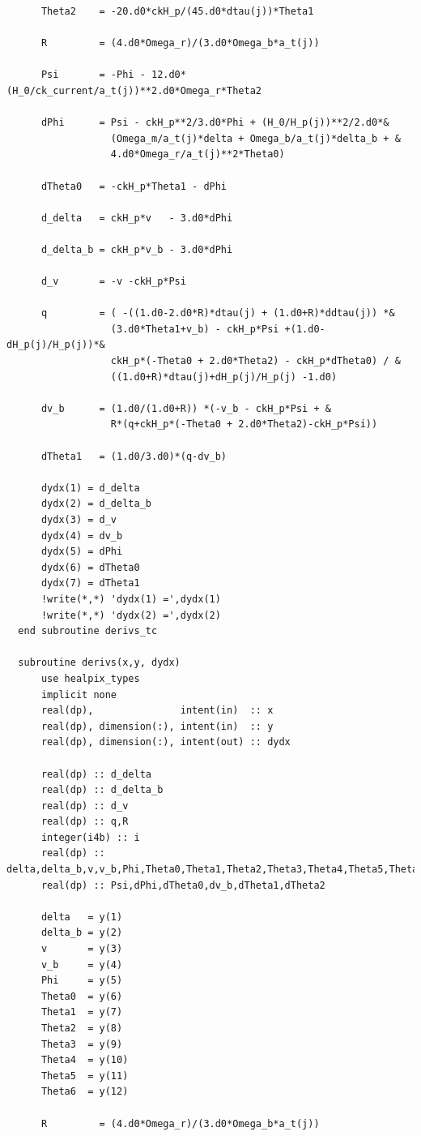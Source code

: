 \documentclass[a4paper]{report}
\begin{document}
\begin{verbatim}
      Theta2    = -20.d0*ckH_p/(45.d0*dtau(j))*Theta1

      R         = (4.d0*Omega_r)/(3.d0*Omega_b*a_t(j))

      Psi       = -Phi - 12.d0*(H_0/ck_current/a_t(j))**2.d0*Omega_r*Theta2

      dPhi      = Psi - ckH_p**2/3.d0*Phi + (H_0/H_p(j))**2/2.d0*&
                  (Omega_m/a_t(j)*delta + Omega_b/a_t(j)*delta_b + &
                  4.d0*Omega_r/a_t(j)**2*Theta0)

      dTheta0   = -ckH_p*Theta1 - dPhi

      d_delta   = ckH_p*v   - 3.d0*dPhi

      d_delta_b = ckH_p*v_b - 3.d0*dPhi

      d_v       = -v -ckH_p*Psi

      q         = ( -((1.d0-2.d0*R)*dtau(j) + (1.d0+R)*ddtau(j)) *&
                  (3.d0*Theta1+v_b) - ckH_p*Psi +(1.d0-dH_p(j)/H_p(j))*&
                  ckH_p*(-Theta0 + 2.d0*Theta2) - ckH_p*dTheta0) / &
                  ((1.d0+R)*dtau(j)+dH_p(j)/H_p(j) -1.d0)

      dv_b      = (1.d0/(1.d0+R)) *(-v_b - ckH_p*Psi + &
                  R*(q+ckH_p*(-Theta0 + 2.d0*Theta2)-ckH_p*Psi))

      dTheta1   = (1.d0/3.d0)*(q-dv_b)

      dydx(1) = d_delta
      dydx(2) = d_delta_b
      dydx(3) = d_v
      dydx(4) = dv_b
      dydx(5) = dPhi
      dydx(6) = dTheta0
      dydx(7) = dTheta1
      !write(*,*) 'dydx(1) =',dydx(1)
      !write(*,*) 'dydx(2) =',dydx(2)
  end subroutine derivs_tc

  subroutine derivs(x,y, dydx) 
      use healpix_types
      implicit none
      real(dp),               intent(in)  :: x
      real(dp), dimension(:), intent(in)  :: y
      real(dp), dimension(:), intent(out) :: dydx

      real(dp) :: d_delta
      real(dp) :: d_delta_b
      real(dp) :: d_v
      real(dp) :: q,R
      integer(i4b) :: i
      real(dp) :: delta,delta_b,v,v_b,Phi,Theta0,Theta1,Theta2,Theta3,Theta4,Theta5,Theta6
      real(dp) :: Psi,dPhi,dTheta0,dv_b,dTheta1,dTheta2

      delta   = y(1)
      delta_b = y(2)
      v       = y(3)
      v_b     = y(4)
      Phi     = y(5)
      Theta0  = y(6)
      Theta1  = y(7)
      Theta2  = y(8)
      Theta3  = y(9)
      Theta4  = y(10)
      Theta5  = y(11)
      Theta6  = y(12)

      R         = (4.d0*Omega_r)/(3.d0*Omega_b*a_t(j))


\end{verbatim}
\end{document}
